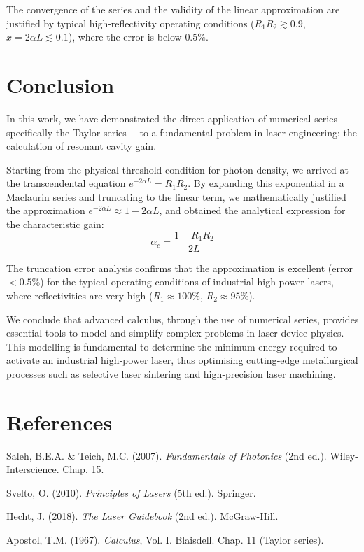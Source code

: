 \documentclass[12pt, a4paper]{article}
\begin{document}
The convergence of the series and the validity of the linear approximation are justified
by typical high‑reflectivity operating conditions ($R_1 R_2 \gtrsim 0.9$, $x = 2\alpha L \lesssim 0.1$), where the error is below $0.5\%$.

\section{Conclusion}

In this work, we have demonstrated the direct application of numerical series
—specifically the Taylor series— to a fundamental problem in laser engineering:
the calculation of resonant cavity gain.

Starting from the physical threshold condition for photon density, we arrived at the
transcendental equation $e^{-2\alpha L} = R_1 R_2$. By expanding this exponential in a
Maclaurin series and truncating to the linear term, we mathematically justified the
approximation $e^{-2\alpha L} \approx 1 - 2\alpha L$, and obtained the analytical
expression for the characteristic gain:
%
\begin{equation*}
  \alpha_c = \frac{1 - R_1 R_2}{2L}
\end{equation*}

The truncation error analysis confirms that the approximation is excellent
(error $< 0.5\%$) for the typical operating conditions of industrial high‑power lasers,
where reflectivities are very high ($R_1 \approx 100\%$, $R_2 \approx 95\%$).

We conclude that advanced calculus, through the use of numerical series, provides essential
tools to model and simplify complex problems in laser device physics. This modelling is
fundamental to determine the minimum energy required to activate an industrial high‑power
laser, thus optimising cutting‑edge metallurgical processes such as selective laser
sintering and high‑precision laser machining.

\section*{References}

\begin{enumerate}[leftmargin=2em, label={[\arabic*]}]
  \item Saleh, B.E.A. \& Teich, M.C. (2007). \textit{Fundamentals of Photonics} (2nd ed.).
        Wiley-Interscience. Chap. 15.
  \item Svelto, O. (2010). \textit{Principles of Lasers} (5th ed.). Springer.
  \item Hecht, J. (2018). \textit{The Laser Guidebook} (2nd ed.). McGraw-Hill.
  \item Apostol, T.M. (1967). \textit{Calculus}, Vol. I. Blaisdell. Chap. 11 (Taylor series).
\end{enumerate}
\end{document}
